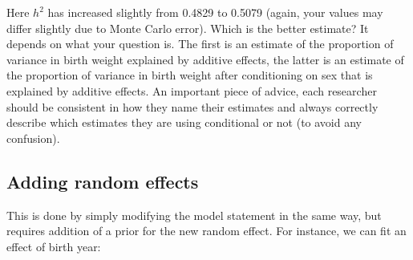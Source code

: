 \documentclass[
  12pt,
]{book}
\newenvironment{Shaded}{\begin{snugshade}}{\end{snugshade}}
\newcommand{\DataTypeTok}[1]{\textcolor[rgb]{0.13,0.29,0.53}{#1}}
\newcommand{\DecValTok}[1]{\textcolor[rgb]{0.00,0.00,0.81}{#1}}
\newcommand{\FloatTok}[1]{\textcolor[rgb]{0.00,0.00,0.81}{#1}}
\newcommand{\KeywordTok}[1]{\textcolor[rgb]{0.13,0.29,0.53}{\textbf{#1}}}
\newcommand{\NormalTok}[1]{#1}
\newcommand{\OperatorTok}[1]{\textcolor[rgb]{0.81,0.36,0.00}{\textbf{#1}}}
\newcommand{\OtherTok}[1]{\textcolor[rgb]{0.56,0.35,0.01}{#1}}
\newcommand{\StringTok}[1]{\textcolor[rgb]{0.31,0.60,0.02}{#1}}
\begin{document}
Here \(h^2\) has increased slightly from 0.4829 to 0.5079 (again, your values may differ slightly due to Monte Carlo error). Which is the better estimate?
It depends on what your question is. The first is an estimate of the proportion of variance in birth weight explained by additive effects, the latter is an estimate of the proportion of variance in birth weight after conditioning on sex that is explained by additive effects.
An important piece of advice, each researcher should be consistent in how they name their estimates and always correctly describe which estimates they are using conditional or not (to avoid any confusion).

\hypertarget{adding-random-effects-1}{%
\subsection{Adding random effects}\label{adding-random-effects-1}}

This is done by simply modifying the model statement in the same way, but requires addition of a prior for the new random effect. For instance, we can fit an effect of birth year:

\begin{Shaded}
\end{Shaded}
\end{document}
